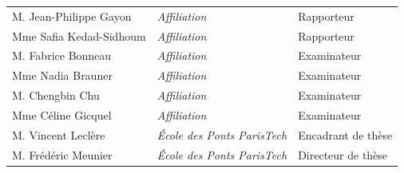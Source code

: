 \begin{tabular}{lll}
{\Large M. Jean-Philippe  {\sc Gayon}} & {\large{\it Affiliation}} & {\large Rapporteur}\\[0.5ex]
{\Large Mme Safia         {\sc Kedad-Sidhoum}} & {\large{\it Affiliation}} & {\large Rapporteur}\\[0.5ex]
{\Large M. Fabrice        {\sc Bonneau}} & {\large{\it Affiliation}} & {\large Examinateur}\\[0.5ex]
{\Large Mme Nadia         {\sc Brauner}} & {\large{\it Affiliation}} & {\large Examinateur}\\[0.5ex]
{\Large M. Chengbin       {\sc Chu}} & {\large{\it Affiliation}} & {\large Examinateur}\\[0.5ex]
{\Large Mme C\'eline      {\sc Gicquel}} & {\large{\it Affiliation}} & {\large Examinateur}\\[0.5ex]
{\Large M. Vincent        {\sc Lecl\`ere}} & {\large{\it \'Ecole des Ponts ParisTech}} & {\large Encadrant de th\`ese}\\[0.5ex]
{\Large M. Fr\'ed\'eric   {\sc Meunier}} & {\large{\it \'Ecole des Ponts ParisTech}} & {\large Directeur de th\`ese}

\end{tabular}

